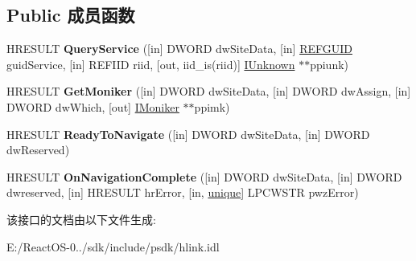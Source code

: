 \subsection*{Public 成员函数}
\begin{DoxyCompactItemize}
\item 
\mbox{\label{interface_i_hlink_site_a85b8ba613bb96ed69fbb472d13bbacdd}} 
H\+R\+E\+S\+U\+LT {\bfseries Query\+Service} (\mbox{[}in\mbox{]} D\+W\+O\+RD dw\+Site\+Data, \mbox{[}in\mbox{]} \hyperlink{struct___g_u_i_d}{R\+E\+F\+G\+U\+ID} guid\+Service, \mbox{[}in\mbox{]} R\+E\+F\+I\+ID riid, \mbox{[}out, iid\+\_\+is(riid)\mbox{]} \hyperlink{interface_i_unknown}{I\+Unknown} $\ast$$\ast$ppiunk)
\item 
\mbox{\label{interface_i_hlink_site_a181bb5bab49ff22ed041451a0c166d01}} 
H\+R\+E\+S\+U\+LT {\bfseries Get\+Moniker} (\mbox{[}in\mbox{]} D\+W\+O\+RD dw\+Site\+Data, \mbox{[}in\mbox{]} D\+W\+O\+RD dw\+Assign, \mbox{[}in\mbox{]} D\+W\+O\+RD dw\+Which, \mbox{[}out\mbox{]} \hyperlink{interface_i_moniker}{I\+Moniker} $\ast$$\ast$ppimk)
\item 
\mbox{\label{interface_i_hlink_site_a7bae2a6fa6eab09b802ed38212418445}} 
H\+R\+E\+S\+U\+LT {\bfseries Ready\+To\+Navigate} (\mbox{[}in\mbox{]} D\+W\+O\+RD dw\+Site\+Data, \mbox{[}in\mbox{]} D\+W\+O\+RD dw\+Reserved)
\item 
\mbox{\label{interface_i_hlink_site_a3bbed3bf1833cc9b151f4fef94d28856}} 
H\+R\+E\+S\+U\+LT {\bfseries On\+Navigation\+Complete} (\mbox{[}in\mbox{]} D\+W\+O\+RD dw\+Site\+Data, \mbox{[}in\mbox{]} D\+W\+O\+RD dwreserved, \mbox{[}in\mbox{]} H\+R\+E\+S\+U\+LT hr\+Error, \mbox{[}in, \hyperlink{interfaceunique}{unique}\mbox{]} L\+P\+C\+W\+S\+TR pwz\+Error)
\end{DoxyCompactItemize}


该接口的文档由以下文件生成\+:\begin{DoxyCompactItemize}
\item 
E\+:/\+React\+O\+S-\/0../sdk/include/psdk/hlink.\+idl\end{DoxyCompactItemize}
